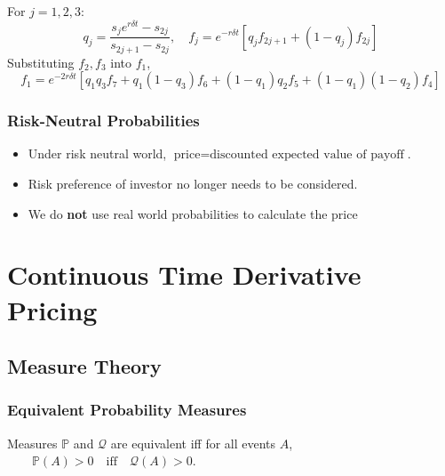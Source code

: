 \documentclass[11pt]{article}
\newcommand{\PR}{\mathbb{P}}
\newcommand{\Q}{\mathcal{Q}}
\begin{document}
\begin{center}
{
		}
		\end{center}
	For \( j = 1,2,3 \):
	\[	q_j = \frac{s_{j}e^{r\delta t} - s_{2j}}{s_{2j+1} - s_{2j}}, \quad
		f_{j} = e^{-r\delta t}\left[q_{j} f_{2j+1} + (1-q_{j})f_{2j}\right]
			\]
	Substituting \( f_2, f_3 \) into \( f_1 \),
	\[	f_1 = e^{-2r\delta t}\left[q_1q_3 f_7 + q_1 (1- q_3) f_6 + 
								  (1-q_1) q_2 f_5 + (1 - q_1)(1-q_2) f_4\right]
		\]
	\subsubsection{Risk-Neutral Probabilities}
	\begin{itemize}
		\item Under risk neutral world, \( \text{price} = \text{discounted expected value of payoff} \).
		\item Risk preference of investor no longer needs to be considered.
		\item We do \textbf{not} use real world probabilities to calculate the price
		\end{itemize}
	\newpage
	\section{Continuous Time Derivative Pricing}
	\subsection{Measure Theory}
	\subsubsection{Equivalent Probability Measures}
	Measures \( \PR \) and \( \Q \) are equivalent iff for all events \( A \), \(\qquad \PR(A)>0\quad\text{iff}\quad\Q(A)>0 \).
\end{document}
